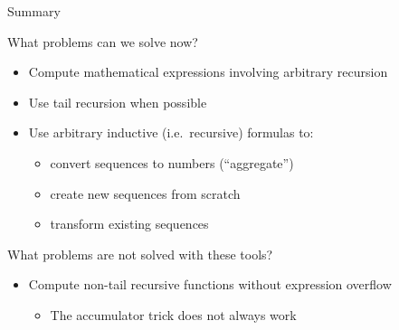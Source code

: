 \documentclass[english]{beamer}
\begin{document}
\begin{frame}{Summary}

What problems can we solve now?
\begin{itemize}
\item Compute mathematical expressions involving arbitrary recursion
\item Use tail recursion when possible
\item Use arbitrary inductive (i.e.\ recursive) formulas to:
\begin{itemize}
\item convert sequences to numbers (``aggregate'')
\item create new sequences from scratch
\item transform existing sequences 
\end{itemize}
\end{itemize}
What problems are not solved with these tools?
\begin{itemize}
\item Compute non-tail recursive functions without expression overflow
\begin{itemize}
\item The accumulator trick does not always work
\end{itemize}
\end{itemize}
\end{frame}
\end{document}
